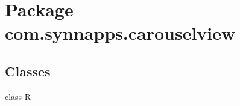 \hypertarget{namespacecom_1_1synnapps_1_1carouselview}{}\section{Package com.\+synnapps.\+carouselview}
\label{namespacecom_1_1synnapps_1_1carouselview}
\subsection*{Classes}
\begin{DoxyCompactItemize}
\item 
class \mbox{\hyperlink{classcom_1_1synnapps_1_1carouselview_1_1_r}{R}}
\end{DoxyCompactItemize}
